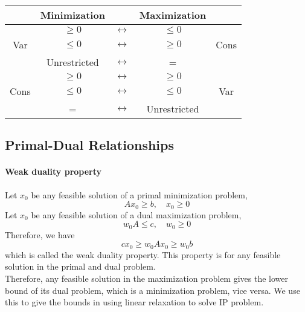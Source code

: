             \begin{table}[!htp]
                \centering
                \begin{tabular}{|c|c|c|c|c|}
                    \hline & Minimization& & Maximization& \\
                    \hline & $\geq 0$ & $\longleftrightarrow$ & $\leq 0$ & \\
                    Var & $\leq 0$ & $\longleftrightarrow$ & $\geq 0$ & Cons \\
                    & Unrestricted & $\longleftrightarrow$ & = & \\
                    \hline & $\geq 0$ & $\longleftrightarrow$ & $\geq 0$ & \\
                    Cons & $\leq 0$ & $\longleftrightarrow$ & $\leq 0$ & Var \\
                    & = & $\longleftrightarrow$ & Unrestricted & \\
                    \hline
                \end{tabular}
            \end{table}                

        \subsection{Primal-Dual Relationships}
            \paragraph{Weak duality property}
                Let $x_0$ be any feasible solution of a primal minimization problem,
                \begin{equation}
                    Ax_0 \ge b, \quad x_0\ge 0 \nonumber
                \end{equation}
                Let $x_0$ be any feasible solution of a dual maximization problem,
                \begin{equation}
                    w_0A \le c, \quad w_0\ge 0 \nonumber
                \end{equation}
                Therefore, we have
                \begin{equation}
                    cx_0 \ge w_0Ax_0 \ge w_0b \nonumber
                \end{equation}
                which is called the weak duality property. This property is for any feasible solution in the primal and dual problem.\\
                Therefore, any feasible solution in the maximization problem gives the lower bound of its dual problem, which is a minimization problem, vice versa. We use this to give the bounds in using linear relaxation to solve IP problem.

